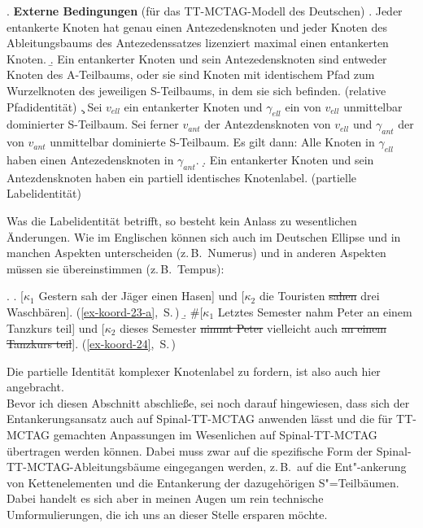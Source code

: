 \ex. {\bf Externe Bedingungen} (für das TT-MCTAG-Modell des Deutschen)
\a. Jeder entankerte Knoten hat genau einen Antezedensknoten und jeder Knoten des Ableitungsbaums des Antezedenssatzes lizenziert maximal einen entankerten Knoten.
\b. Ein entankerter Knoten und sein Antezedensknoten sind entweder Knoten des A-Teilbaums, oder sie sind Knoten mit identischem Pfad zum Wurzelknoten des jeweiligen S-Teilbaums, in dem sie sich befinden. (relative Pfadidentität) 
\c. Sei $v_{ell}$ ein entankerter Knoten und $\gamma_{ell}$ ein von $v_{ell}$ unmittelbar dominierter S-Teilbaum. Sei ferner $v_{ant}$ der Antezdensknoten von $v_{ell}$ und $\gamma_{ant}$ der von $v_{ant}$ unmittelbar dominierte S-Teilbaum. Es gilt dann: Alle Knoten in $\gamma_{ell}$ haben einen Antezedensknoten in $\gamma_{ant}$. 
\d. Ein entankerter Knoten und sein Antezdensknoten haben ein partiell identisches Knotenlabel. (partielle Labelidentität)   
 
Was die Labelidentität betrifft, so besteht kein Anlass zu wesentlichen Änderungen. Wie im Englischen können sich auch im Deutschen Ellipse und  in manchen Aspekten unterscheiden (z.\,B.\ Numerus) und in anderen Aspekten müssen sie übereinstimmen (z.\,B.\ Tempus): 

\ex. 
\a. [$\kappa_1$ Gestern sah der Jäger einen Hasen] und [$\kappa_2$ die Touristen \sout{sahen} drei Waschbären]. \hfill (\ref{ex-koord-23-a},~S.\,\pageref{ex-koord-23-a})\label{ex-koord-23-a-wdh}
\b. \#[$\kappa_1$ Letztes Semester nahm Peter an einem Tanzkurs teil] und [$\kappa_2$ dieses Semester \sout{nimmt Peter} vielleicht auch \sout{an einem Tanzkurs teil}].\label{ex-koord-24-wdh} \hfill (\ref{ex-koord-24},~S.\,\pageref{ex-koord-24})

Die partielle Identität komplexer Knotenlabel zu fordern, ist also auch hier angebracht.  \\

Bevor ich diesen Abschnitt abschlie\ss e, sei noch darauf hingewiesen, dass sich der Entankerungsansatz auch auf Spinal-TT-MCTAG anwenden lässt und die für TT-MCTAG gemachten Anpassungen im Wesenlichen auf Spinal-TT-MCTAG übertragen werden können. Dabei muss zwar auf die spezifische Form der Spinal-TT-MCTAG-Ableitungsbäume eingegangen werden, z.\,B.\ auf die Ent"-ankerung von Kettenelementen und die Entankerung der dazugehörigen S"=Teilbäumen. Dabei handelt es sich aber in meinen Augen um rein technische Umformulierungen, die ich uns an dieser Stelle ersparen möchte. \\

